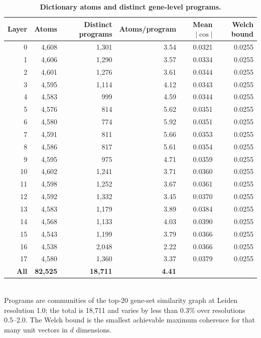\begin{table}[htbp]
\centering
\caption{\textbf{Dictionary atoms and distinct gene-level programs.}}
\label{tab:concepts}
\smallskip
\small
\begin{tabular}{rrrrrr}
\toprule
Layer & Atoms & Distinct programs & Atoms/program & Mean $|\cos|$ & Welch bound \\
\midrule
0 & 4,608 & 1,301 & 3.54 & 0.0321 & 0.0255 \\
1 & 4,606 & 1,290 & 3.57 & 0.0334 & 0.0255 \\
2 & 4,601 & 1,276 & 3.61 & 0.0344 & 0.0255 \\
3 & 4,595 & 1,114 & 4.12 & 0.0343 & 0.0255 \\
4 & 4,583 & 999 & 4.59 & 0.0344 & 0.0255 \\
5 & 4,576 & 814 & 5.62 & 0.0351 & 0.0255 \\
6 & 4,580 & 774 & 5.92 & 0.0351 & 0.0255 \\
7 & 4,591 & 811 & 5.66 & 0.0353 & 0.0255 \\
8 & 4,586 & 817 & 5.61 & 0.0354 & 0.0255 \\
9 & 4,595 & 975 & 4.71 & 0.0359 & 0.0255 \\
10 & 4,602 & 1,241 & 3.71 & 0.0360 & 0.0255 \\
11 & 4,598 & 1,252 & 3.67 & 0.0361 & 0.0255 \\
12 & 4,592 & 1,332 & 3.45 & 0.0370 & 0.0255 \\
13 & 4,583 & 1,179 & 3.89 & 0.0384 & 0.0255 \\
14 & 4,568 & 1,133 & 4.03 & 0.0390 & 0.0255 \\
15 & 4,543 & 1,199 & 3.79 & 0.0366 & 0.0255 \\
16 & 4,538 & 2,048 & 2.22 & 0.0366 & 0.0255 \\
17 & 4,580 & 1,360 & 3.37 & 0.0379 & 0.0255 \\
\midrule
\textbf{All} & \textbf{82,525} & \textbf{18,711} & \textbf{4.41} &  &  \\
\bottomrule
\end{tabular}
\\[2pt]
\footnotesize Programs are communities of the top-20 gene-set similarity graph at Leiden resolution 1.0; the total is 18,711 and varies by less than 0.3\% over resolutions 0.5--2.0. The Welch bound is the smallest achievable maximum coherence for that many unit vectors in $d$ dimensions.
\end{table}
